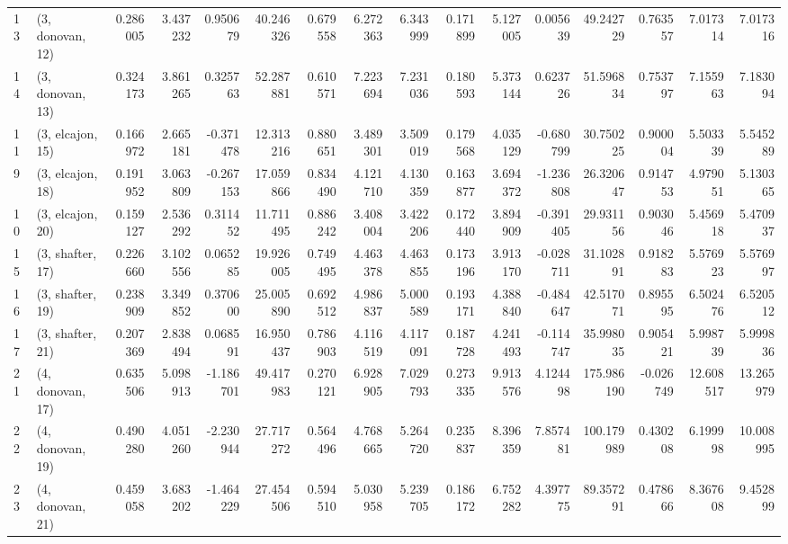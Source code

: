 \begin{tabular}{llrrrrrrrrrrrrrr}
13 &  (3, donovan, 12) &   0.286005 &  3.437232 &  0.950679 &  40.246326 &  0.679558 &   6.272363 &  6.343999 &  0.171899 &   5.127005 &  0.005639 &   49.242729 &  0.763557 &   7.017314 &   7.017316 \\
14 &  (3, donovan, 13) &   0.324173 &  3.861265 &  0.325763 &  52.287881 &  0.610571 &   7.223694 &  7.231036 &  0.180593 &   5.373144 &  0.623726 &   51.596834 &  0.753797 &   7.155963 &   7.183094 \\
11 &  (3, elcajon, 15) &   0.166972 &  2.665181 & -0.371478 &  12.313216 &  0.880651 &   3.489301 &  3.509019 &  0.179568 &   4.035129 & -0.680799 &   30.750225 &  0.900004 &   5.503339 &   5.545289 \\
9  &  (3, elcajon, 18) &   0.191952 &  3.063809 & -0.267153 &  17.059866 &  0.834490 &   4.121710 &  4.130359 &  0.163877 &   3.694372 & -1.236808 &   26.320647 &  0.914753 &   4.979051 &   5.130365 \\
10 &  (3, elcajon, 20) &   0.159127 &  2.536292 &  0.311452 &  11.711495 &  0.886242 &   3.408004 &  3.422206 &  0.172440 &   3.894909 & -0.391405 &   29.931156 &  0.903046 &   5.456918 &   5.470937 \\
15 &  (3, shafter, 17) &   0.226660 &  3.102556 &  0.065285 &  19.926005 &  0.749495 &   4.463378 &  4.463855 &  0.173196 &   3.913170 & -0.028711 &   31.102891 &  0.918283 &   5.576923 &   5.576997 \\
16 &  (3, shafter, 19) &   0.238909 &  3.349852 &  0.370600 &  25.005890 &  0.692512 &   4.986837 &  5.000589 &  0.193171 &   4.388840 & -0.484647 &   42.517071 &  0.895595 &   6.502476 &   6.520512 \\
17 &  (3, shafter, 21) &   0.207369 &  2.838494 &  0.068591 &  16.950437 &  0.786903 &   4.116519 &  4.117091 &  0.187728 &   4.241493 & -0.114747 &   35.998035 &  0.905421 &   5.998739 &   5.999836 \\
21 &  (4, donovan, 17) &   0.635506 &  5.098913 & -1.186701 &  49.417983 &  0.270121 &   6.928905 &  7.029793 &  0.273335 &   9.913576 &  4.124498 &  175.986190 & -0.026749 &  12.608517 &  13.265979 \\
22 &  (4, donovan, 19) &   0.490280 &  4.051260 & -2.230944 &  27.717272 &  0.564496 &   4.768665 &  5.264720 &  0.235837 &   8.396359 &  7.857481 &  100.179989 &  0.430208 &   6.199998 &  10.008995 \\
23 &  (4, donovan, 21) &   0.459058 &  3.683202 & -1.464229 &  27.454506 &  0.594510 &   5.030958 &  5.239705 &  0.186172 &   6.752282 &  4.397775 &   89.357291 &  0.478666 &   8.367608 &   9.452899 \\

\end{tabular}
